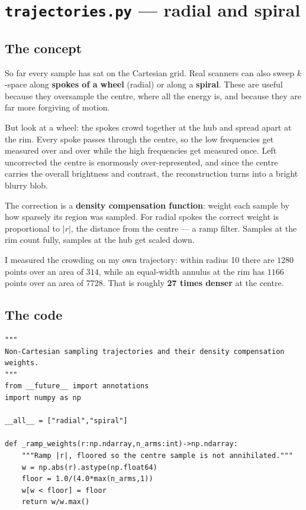 \documentclass[11pt,a4paper]{article}
\begin{document}
\section{\texttt{trajectories.py} --- radial and spiral}

\subsection{The concept}

So far every sample has sat on the Cartesian grid. Real scanners can also sweep
$k$-space along \textbf{spokes of a wheel} (radial) or along a \textbf{spiral}.
These are useful because they oversample the centre, where all the energy is, and
because they are far more forgiving of motion.

But look at a wheel: the spokes crowd together at the hub and spread apart at the
rim. Every spoke passes through the centre, so the low frequencies get measured
over and over while the high frequencies get measured once. Left uncorrected the
centre is enormously over-represented, and since the centre carries the overall
brightness and contrast, the reconstruction turns into a bright blurry blob.

The correction is a \textbf{density compensation function}: weight each sample by
how sparsely its region was sampled. For radial spokes the correct weight is
proportional to $|r|$, the distance from the centre --- a ramp filter. Samples at
the rim count fully, samples at the hub get scaled down.

I measured the crowding on my own trajectory: within radius 10 there are $1280$
points over an area of $314$, while an equal-width annulus at the rim has $1166$
points over an area of $7728$. That is roughly \textbf{27 times denser} at the
centre.

\subsection{The code}

\begin{lstlisting}
"""
Non-Cartesian sampling trajectories and their density compensation weights.
"""
from __future__ import annotations
import numpy as np

__all__ = ["radial","spiral"]

def _ramp_weights(r:np.ndarray,n_arms:int)->np.ndarray:
    """Ramp |r|, floored so the centre sample is not annihilated."""
    w = np.abs(r).astype(np.float64)
    floor = 1.0/(4.0*max(n_arms,1))
    w[w < floor] = floor
    return w/w.max()
\end{lstlisting}
\end{document}
